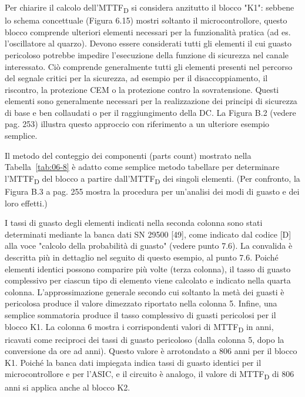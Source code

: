 Per chiarire il calcolo dell'MTTF\textsubscript{D} si considera anzitutto il blocco "K1": sebbene lo schema concettuale (Figura 6.15) mostri soltanto il microcontrollore, questo blocco comprende ulteriori elementi necessari per la funzionalità pratica (ad es. l'oscillatore al quarzo). Devono essere considerati tutti gli elementi il cui guasto pericoloso potrebbe impedire l'esecuzione della funzione di sicurezza nel canale interessato. Ciò comprende generalmente tutti gli elementi presenti nel percorso del segnale critici per la sicurezza, ad esempio per il disaccoppiamento, il riscontro, la protezione CEM o la protezione contro la sovratensione. Questi elementi sono generalmente necessari per la realizzazione dei principi di sicurezza di base e ben collaudati o per il raggiungimento della DC. La Figura B.2 (vedere pag. 253) illustra questo approccio con riferimento a un ulteriore esempio semplice. 

Il metodo del conteggio dei componenti (parts count) mostrato nella Tabella~\ref{tab:06-8} è adatto come semplice metodo tabellare per determinare l'MTTF\textsubscript{D} del blocco a partire dall'MTTF\textsubscript{D} dei singoli elementi. (Per confronto, la Figura B.3 a pag. 255 mostra la procedura per un'analisi dei modi di guasto e dei loro effetti.)

I tassi di guasto degli elementi indicati nella seconda colonna sono stati determinati mediante la banca dati SN 29500 [49], come indicato dal codice [D] alla voce "calcolo della probabilità di guasto" (vedere punto 7.6). La convalida è descritta più in dettaglio nel seguito di questo esempio, al punto 7.6. Poiché elementi identici possono comparire più volte (terza colonna), il tasso di guasto complessivo per ciascun tipo di elemento viene calcolato e indicato nella quarta colonna. L'approssimazione generale secondo cui soltanto la metà dei guasti è pericolosa produce il valore dimezzato riportato nella colonna 5. Infine, una semplice sommatoria produce il tasso complessivo di guasti pericolosi per il blocco K1. La colonna 6 mostra i corrispondenti valori di MTTF\textsubscript{D} in anni, ricavati come reciproci dei tassi di guasto pericoloso (dalla colonna 5, dopo la conversione da ore ad anni). Questo valore è arrotondato a 806 anni per il blocco K1. Poiché la banca dati impiegata indica tassi di guasto identici per il microcontrollore e per l'ASIC, e il circuito è analogo, il valore di MTTF\textsubscript{D} di 806 anni si applica anche al blocco K2.

